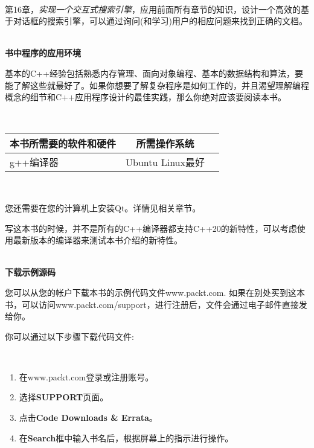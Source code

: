 \noindent\textbf{}\ \par
\textsf{第16章}，\textit{实现一个交互式搜索引擎}，应用前面所有章节的知识，设计一个高效的基于对话框的搜索引擎，可以通过询问(和学习)用户的相应问题来找到正确的文档。

\hspace*{\fill} \\ %
\noindent\textbf{书中程序的应用环境}\ \par
基本的C++经验包括熟悉内存管理、面向对象编程、基本的数据结构和算法，要能了解这些就最好了。如果你想要了解复杂程序是如何工作的，并且渴望理解编程概念的细节和C++应用程序设计的最佳实践，那么你绝对应该要阅读本书。 \par

\hspace*{\fill} \\ %
\begin{tabular}{|l|c|r|} %
	\hline 
	\textbf{本书所需要的软件和硬件}&\textbf{所需操作系统}\\
	\hline  
	g++编译器&Ubuntu Linux最好\\
	\hline 
\end{tabular}

\noindent\textbf{}\ \par
您还需要在您的计算机上安装Qt。详情见相关章节。\par

写这本书的时候，并不是所有的C++编译器都支持C++20的新特性，可以考虑使用最新版本的编译器来测试本书介绍的新特性。 \par

\hspace*{\fill} \\ %
\noindent\textbf{下载示例源码} \par
您可以从您的帐户下载本书的示例代码文件\textsf{www.packt.com}. 如果在别处买到这本书，可以访问\textsf{www.packt.com/support}，进行注册后，文件会通过电子邮件直接发给你。 \par

你可以通过以下步骤下载代码文件: \par

\noindent\textbf{}\ \par
\begin{enumerate}
	\item 在\textsf{www.packt.com}登录或注册账号。
	\item 选择\textbf{SUPPORT}页面。
	\item 点击\textbf{Code Downloads \& Errata}。
	\item 在\textbf{Search}框中输入书名后，根据屏幕上的指示进行操作。
\end{enumerate}

